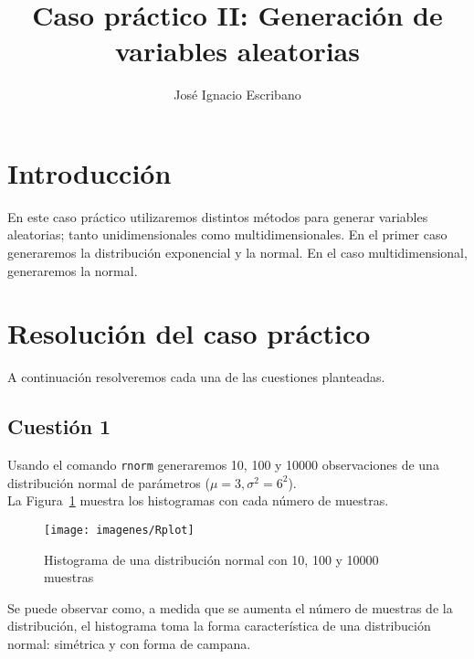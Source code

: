 \documentclass[12pt,a4paper,twoside,openright,titlepage,final]{article}
\author{José Ignacio Escribano}
\title{Caso práctico II: Generación de variables aleatorias}
\begin{document}
\setcounter{page}{1}


\listoftables
\thispagestyle{empty}
\newpage

\tableofcontents
\thispagestyle{empty}
\newpage


\setcounter{page}{1}

\section{Introducción}

En este caso práctico utilizaremos distintos métodos para generar variables aleatorias; tanto unidimensionales como multidimensionales. En el primer caso generaremos la distribución exponencial y la normal. En el caso multidimensional, generaremos la normal.

\section{Resolución del caso práctico}

A continuación resolveremos cada una de las cuestiones planteadas.

\subsection{Cuestión 1}\label{cuestion:1}

Usando el comando \texttt{rnorm} generaremos 10, 100 y 10000 observaciones de una distribución normal de parámetros ($\mu = 3, \sigma^2 = 6^2$).\\

La Figura~\ref{fig:Rplot} muestra los histogramas con cada número de muestras.\\

\begin{figure}[htbp!]
\centering
\texttt{[image: imagenes/Rplot]}
\caption{Histograma de una distribución normal con 10, 100 y 10000 muestras}
\label{fig:Rplot}
\end{figure}

Se puede observar como, a medida que se aumenta el número de muestras de la distribución, el histograma toma la forma característica de una distribución normal: simétrica y con forma de campana.\\
\end{document}
